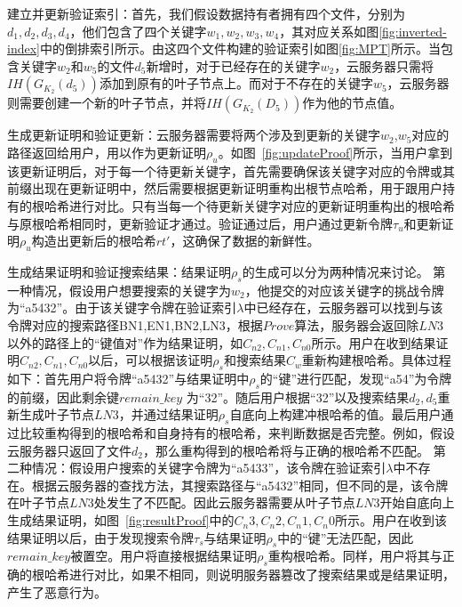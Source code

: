 {\heiti 建立并更新验证索引：}首先，我们假设数据持有者拥有四个文件，分别为$d_1,d_2,d_3,d_4$，他们包含了四个关键字$w_1,w_2,w_3,w_4$，其对应关系如图\ref{fig:inverted-index}中的倒排索引所示。由这四个文件构建的验证索引如图\ref{fig:MPT}所示。当包含关键字$w_2$和$w_5$的文件$d_5$新增时，对于已经存在的关键字$w_2$，云服务器只需将$IH(G_{K_2}(d_5))$添加到原有的叶子节点上。而对于不存在的关键字$w_5$，云服务器则需要创建一个新的叶子节点，并将$IH(G_{K_2}(D_5))$作为他的节点值。

{\heiti 生成更新证明和验证更新：}云服务器需要将两个涉及到更新的关键字$w_2$,$w_5$对应的路径返回给用户，用以作为更新证明$\rho_u$。如图~\ref{fig:updateProof}所示，当用户拿到该更新证明后，对于每一个待更新关键字，首先需要确保该关键字对应的令牌或其前缀出现在更新证明中，然后需要根据更新证明重构出根节点哈希，用于跟用户持有的根哈希进行对比。只有当每一个待更新关键字对应的更新证明重构出的根哈希与原根哈希相同时，更新验证才通过。验证通过后，用户通过更新令牌$\tau_u$和更新证明$\rho_u$构造出更新后的根哈希$rt'$，这确保了数据的新鲜性。

{\heiti 生成结果证明和验证搜索结果：}结果证明$\rho_s$的生成可以分为两种情况来讨论。
第一种情况，假设用户想要搜索的关键字为$w_2$，他提交的对应该关键字的挑战令牌为“a5432”。由于该关键字令牌在验证索引$\lambda$中已经存在，云服务器可以找到与该令牌对应的搜索路径{BN1,EN1,BN2,LN3}，根据$Prove$算法，服务器会返回除$LN3$以外的路径上的“键值对”作为结果证明，如$C_{n2},C_{n1},C_{n0}$所示。用户在收到结果证明$C_{n2},C_{n1},C_{n0}$以后，可以根据该证明$\rho_s$和搜索结果$C_w$重新构建根哈希。具体过程如下：首先用户将令牌“a5432”与结果证明中$\rho_s$的“键”进行匹配，发现“a54”为令牌的前缀，因此剩余键$remain\_key$ 为“32”。随后用户根据“32”以及搜索结果$d_2,d_5$重新生成叶子节点$LN3$，并通过结果证明$\rho_s$自底向上构建冲根哈希的值。最后用户通过比较重构得到的根哈希和自身持有的根哈希，来判断数据是否完整。例如，假设云服务器只返回了文件$d_2$，那么重构得到的根哈希将与正确的根哈希不匹配。
第二种情况：假设用户搜索的关键字令牌为“a5433”，该令牌在验证索引$\lambda$中不存在。根据云服务器的查找方法，其搜索路径与“a5432”相同，但不同的是，该令牌在叶子节点$LN3$处发生了不匹配。因此云服务器需要从叶子节点$LN3$开始自底向上生成结果证明，如图~\ref{fig:resultProof}中的$C_n3,C_n2,C_n1,C_n0$所示。用户在收到该结果证明以后，由于发现搜索令牌$\tau_s$与结果证明$\rho_s$中的“键”无法匹配，因此$remain\_key$被置空。用户将直接根据结果证明$\rho_s$重构根哈希。同样，用户将其与正确的根哈希进行对比，如果不相同，则说明服务器篡改了搜索结果或是结果证明，产生了恶意行为。


